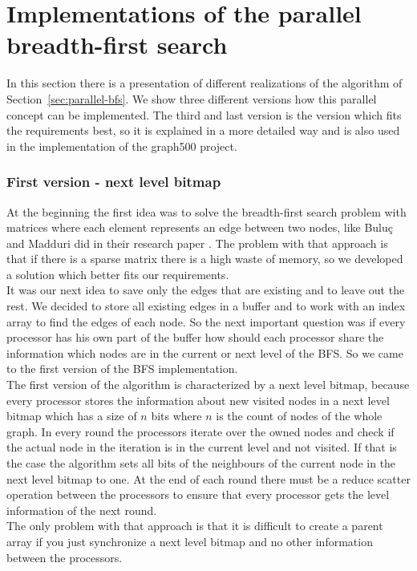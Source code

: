 \documentclass[12pt,a4paper]{article}
\begin{document}
\section{Implementations of the parallel breadth-first search}
\label{sec:implementations}

In this section there is a presentation of different realizations of the algorithm of Section~\ref{sec:parallel-bfs}. We show three different versions how this parallel concept can be implemented. The third and last version is the version which fits the requirements best, so it is explained in a more detailed way and is also used in the implementation of the graph500 project.

\subsubsection{First version - next level bitmap}
\label{sec:firstversion}

At the beginning the first idea was to solve the breadth-first search problem with matrices where each element represents an edge between two nodes, like Buluç and Madduri did in their research paper \cite{matrices}. The problem with that approach is that if there is a sparse matrix there is a high waste of memory, so we developed a solution which better fits our requirements.\\
It was our next idea to save only the edges that are existing and to leave out the rest. We decided to store all existing edges in a buffer and to work with an index array to find the edges of each node. So the next important question was if every processor has his own part of the buffer how should each processor share the information which nodes are in the current or next level of the BFS. So we came to the first version of the BFS implementation.\\
The first version of the algorithm is characterized by a next level bitmap, because every processor stores the information about new visited nodes in a next level bitmap which has a size of \(n\) bits where \(n\) is the count of nodes of the whole graph. In every round the processors iterate over the owned nodes and check if the actual node in the iteration is in the current level and not visited. If that is the case the algorithm sets all bits of the neighbours of the current node in the next level bitmap to one. At the end of each round there must be a reduce scatter operation between the processors to ensure that every processor gets the level information of the next round.\\
The only problem with that approach is that it is difficult to create a parent array if you just synchronize a next level bitmap and no other information between the processors.
\end{document}
